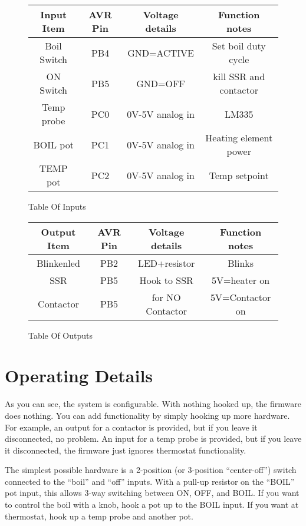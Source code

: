 \documentclass[dvips,12pt]{article}
\begin{document}
\renewcommand{\arraystretch}{1.4}%
\begin{figure}[h]
\centering
\begin{tabular}{|c|c|c|c|}
\hline
Input Item&AVR Pin&Voltage details& Function notes\\
\hline
Boil Switch&PB4&GND=ACTIVE&Set boil duty cycle \\
\hline
ON Switch&PB5&GND=OFF&kill SSR and contactor \\
\hline
Temp probe&PC0&0V-5V analog in&LM335 \\
\hline
BOIL pot&PC1&0V-5V analog in&Heating element power\\
\hline
TEMP pot&PC2&0V-5V analog in&Temp setpoint\\
\hline
\end{tabular}
\caption{Table Of Inputs}
\label{fig:inputs}
\end{figure}

\renewcommand{\arraystretch}{1.4}%
\begin{figure}[h]
\centering
\begin{tabular}{|c|c|c|c|}
\hline
Output Item&AVR Pin&Voltage details& Function notes\\
\hline
Blinkenled&PB2&LED+resistor&Blinks\\
\hline
SSR&PB5&Hook to SSR&5V=heater on\\
\hline
Contactor&PB5&for NO Contactor&5V=Contactor on\\
\hline
\end{tabular}
\caption{Table Of Outputs}
\label{fig:inputs}
\end{figure}

\section{Operating Details}

As you can see, the system is configurable. With nothing hooked up, the firmware does nothing. You can add
functionality by simply hooking up more hardware. For example, an output for a contactor
is provided, but if you leave it disconnected, no problem. An input for a
temp probe is provided, but if you leave it disconnected, the firmware just
ignores thermostat functionality. 

The simplest possible
hardware is a 2-position (or 3-position ``center-off'') switch connected to
the ``boil'' and ``off'' inputs. With a pull-up resistor on the ``BOIL''
pot input, this allows 3-way switching between ON, OFF, and BOIL. If you
want to control the boil with a knob, hook a pot up to the BOIL input. If
you want at thermostat, hook up a temp probe and another pot. 
\end{document}
